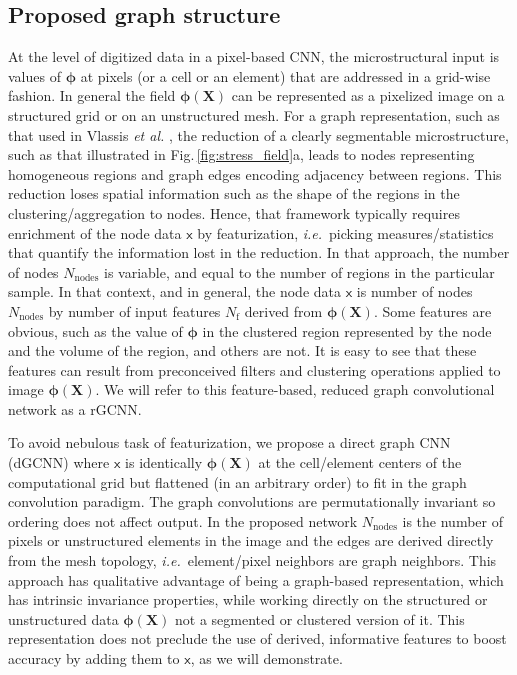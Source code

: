 \documentclass[12pt,reqno]{article}
\newcommand{\fref}[1]{Fig.\,\ref{#1}}
\newcommand{\ie}{{\it i.e.}\!\, }
\newcommand{\etal}{{\it et al.} }
\newcommand{\Xb}{\mathbf{X}}
\newcommand{\xs}{\mathsf{x}}
\newcommand{\phib}{{\boldsymbol{\phi}}}
\newcommand{\DGCNN}{{dGCNN}}
\newcommand{\RGCNN}{{rGCNN}}
\newcommand{\Nf}{N_\text{f}}
\begin{document}
\subsection{Proposed graph structure}
At the level of digitized data in a pixel-based CNN, the microstructural input is values of $\phib$ at pixels (or a cell or an element) that are addressed in a grid-wise fashion.
In general the field $\phib(\Xb)$ can be represented as a pixelized image on a structured grid or on an unstructured mesh.
For a graph representation, such as that used in Vlassis \etal \cite{vlassis2020geometric}, the reduction of a clearly segmentable microstructure, such as that illustrated in \fref{fig:stress_field}a, leads to nodes representing homogeneous regions and graph edges encoding adjacency between regions.
This reduction loses spatial information such as the shape of the regions in the clustering/aggregation to nodes.
Hence, that framework typically requires enrichment of the node data $\xs$ by featurization, \ie picking measures/statistics that quantify the information lost in the reduction.
In that approach, the number of nodes $N_\text{nodes}$ is variable, and equal to the number of regions in the particular sample.
In that context, and in general, the node data $\xs$ is number of nodes $N_\text{nodes}$ by number of input features  $\Nf$ derived from $\phib(\Xb)$.
Some features are obvious, such as the value of $\phib$ in the clustered region represented by the node and the volume of the region, and others are not.
It is easy to see that these features can result from preconceived filters and clustering operations applied to image $\phib(\Xb)$.
We will refer to this feature-based, reduced graph convolutional network as a \RGCNN.

To avoid nebulous task of featurization, we propose a direct graph CNN (\DGCNN) where $\xs$ is identically $\phib(\Xb)$ at the cell/element centers of the computational grid but flattened (in an arbitrary order) to fit in the graph convolution paradigm.
The graph convolutions are permutationally invariant so ordering does not affect output.
In the proposed network $N_\text{nodes}$ is the number of pixels or unstructured elements in the image and the edges are derived directly from the mesh topology, \ie element/pixel neighbors are graph neighbors.
This approach has qualitative advantage of being a graph-based representation, which has intrinsic invariance properties, while working directly on the structured or unstructured data $\phib(\Xb)$ not a segmented or clustered version of it.
This representation does not preclude the use of derived, informative features to boost accuracy by adding them to $\xs$, as we will demonstrate.
\end{document}

